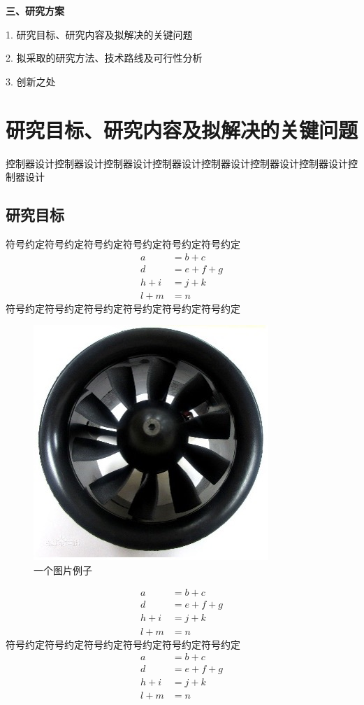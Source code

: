 \textbf{\fangsong\xiaosihao 三、研究方案}
\begin{ubox}
\setcounter{section}{0}
\setcounter{figure}{0}
\setcounter{table}{0}
\setlength{\parindent}{0em} 
1. 研究目标、研究内容及拟解决的关键问题
\vspace{-0.25cm}

2. 拟采取的研究方法、技术路线及可行性分析
\vspace{-0.25cm}

3. 创新之处
\setlength{\parindent}{2em} 
\section{研究目标、研究内容及拟解决的关键问题}
控制器设计控制器设计控制器设计控制器设计控制器设计控制器设计控制器设计控制器设计
\subsection{研究目标}
符号约定符号约定符号约定符号约定符号约定符号约定
\setcounter{equation}{0} 
\begin{equation}
	\begin{aligned}
		a &= b + c \\
		d &= e + f + g \\
		h + i &= j + k \\
		l + m &= n
	\end{aligned}
\end{equation}
符号约定符号约定符号约定符号约定符号约定符号约定
\begin{figure}[H]
	\centering
	\includegraphics[width=0.4\linewidth]{p1.jpg}
	\caption{一个图片例子}
	\label{fig:main}
\end{figure}

\begin{equation}
	\begin{aligned}
		a &= b + c \\
		d &= e + f + g \\
		h + i &= j + k \\
		l + m &= n
	\end{aligned}
\end{equation}
符号约定符号约定符号约定符号约定符号约定符号约定
\begin{equation}
	\begin{aligned}
		a &= b + c \\
		d &= e + f + g \\
		h + i &= j + k \\
		l + m &= n
	\end{aligned}
\end{equation}

\end{ubox}
